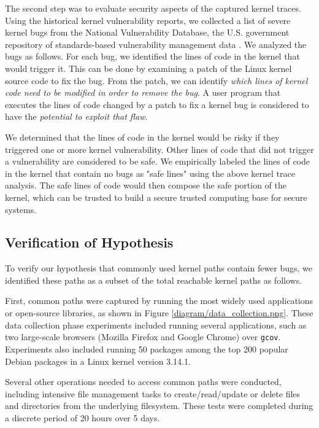 The second step was to evaluate security aspects of the captured kernel traces.%
Using the historical kernel vulnerability reports, we collected a list of
severe kernel bugs from
the National Vulnerability Database, the U.S. government repository of
standards-based 
vulnerability management data \cite{NVD}. We analyzed the bugs as
follows. For each bug, we identified the lines of code
in the kernel that would trigger it. This can be done by examining
a patch of the Linux kernel source code to fix the bug. From the patch,
we can identify \textit{which lines of kernel code need to be modified in order to
remove the bug}.
A user program that executes the lines of code changed by a patch to fix a
kernel bug is considered to have the \textit{potential to exploit that flaw}.

We determined that the lines of code in the kernel would be risky
if they triggered one or more kernel vulnerability. Other lines of code
that did not trigger a vulnerability are considered to be safe. We empirically
 labeled the lines of code in the kernel that contain no bugs as "safe lines"
using the above kernel trace analysis.
The safe lines of code would then compose the safe portion of the kernel, which can be trusted to build a secure trusted computing base for secure systems.

\subsection{Verification of Hypothesis}
\label{Verification-of-Hypothesis}

To verify our hypothesis that commonly used kernel paths contain fewer bugs,
we identified these paths as a subset of the total reachable kernel paths as follows.

First, common paths were captured by running the most widely used applications
or open-source libraries, as shown in Figure \ref{diagram/data_collection.png}.
These data collection phase experiments included running several applications,
such as two large-scale browsers (Mozilla Firefox and Google Chrome)
 over \texttt{gcov}. Experiments also included running 50 packages among
 the top 200 popular Debian packages \cite{Top-Packages}
 in a Linux kernel version 3.14.1.

Several other operations needed to access common paths were conducted, including
intensive file management tasks to create/read/update or delete files and
directories from the underlying filesystem. These tests were completed
during a discrete period of 20 hours over 5 days.

